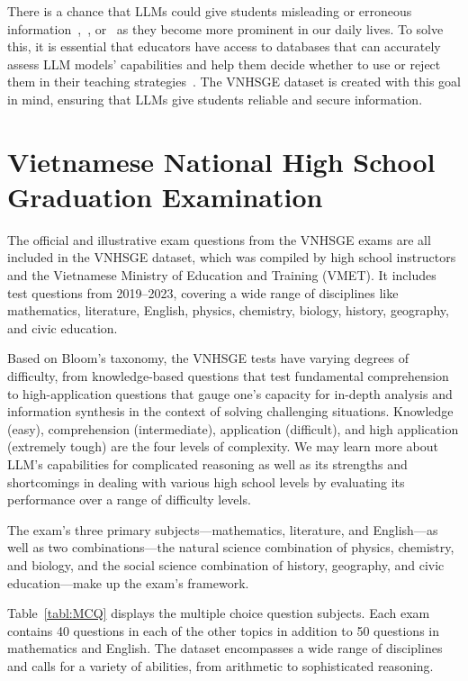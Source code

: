 \documentclass{article}
\begin{document}
{	There is a chance that LLMs could give students misleading or erroneous information~\cite{thorp2023chatgpt},~\cite{borji2023categorical}, or~\cite{dwivedi2023so} as they become more prominent in our daily lives. To solve this, it is essential that educators have access to databases that can accurately assess LLM models' capabilities and help them decide whether to use or reject them in their teaching strategies~\cite{rudolph2023chatgpt}. The VNHSGE dataset is created with this goal in mind, ensuring that LLMs give students reliable and secure information.
	
	\section{Vietnamese National High School Graduation Examination}
	\label{sec:Exam}
	
	The official and illustrative exam questions from the VNHSGE exams are all included in the VNHSGE dataset, which was compiled by high school instructors and the Vietnamese Ministry of Education and Training (VMET). It includes test questions from 2019–2023, covering a wide range of disciplines like mathematics, literature, English, physics, chemistry, biology, history, geography, and civic education. 
	
	Based on Bloom's taxonomy, the VNHSGE tests have varying degrees of difficulty, from knowledge-based questions that test fundamental comprehension to high-application questions that gauge one's capacity for in-depth analysis and information synthesis in the context of solving challenging situations. Knowledge (easy), comprehension (intermediate), application (difficult), and high application (extremely tough) are the four levels of complexity. We may learn more about LLM's capabilities for complicated reasoning as well as its strengths and shortcomings in dealing with various high school levels by evaluating its performance over a range of difficulty levels.
	
	The exam's three primary subjects—mathematics, literature, and English—as well as two combinations—the natural science combination of physics, chemistry, and biology, and the social science combination of history, geography, and civic education—make up the exam's framework.
	
	Table~\ref{tabl:MCQ} displays the multiple choice question subjects. Each exam contains 40 questions in each of the other topics in addition to 50 questions in mathematics and English. The dataset encompasses a wide range of disciplines and calls for a variety of abilities, from arithmetic to sophisticated reasoning.
	
}
\end{document}
